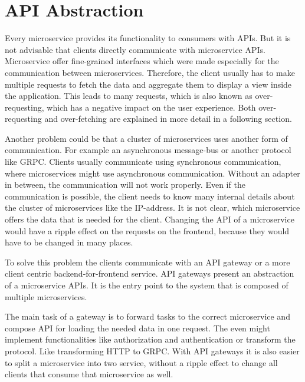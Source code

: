 \section{API Abstraction}

Every microservice provides its functionality to consumers with APIs. But it is not advisable that clients directly communicate with microservice APIs. Microservice offer fine-grained interfaces which were made especially for the communication between microservices. Therefore, the client usually has to make multiple requests to fetch the data and aggregate them to display a view inside the application. \cite[69]{book:2021:newman:background:bff:micro-services} This leads to many requests, which is also known as over-requesting, which has a negative impact on the user experience. \cite[254, 257]{book:2018:richardson:background:bff:microservices-patterns} Both over-requesting and over-fetching are explained in more detail in a following section.

\bigskip

\noindent Another problem could be that a cluster of microservices uses another form of communication. For example an asynchronous message-bus or another protocol like GRPC. Clients usually communicate using synchronous communication, where microservices might use asynchronous communication. Without an adapter in between, the communication will not work properly. Even if the communication is possible, the client needs to know many internal details about the cluster of microservices like the IP-address. It is not clear, which microservice offers the data that is needed for the client. Changing the API of a microservice would have a ripple effect on the requests on the frontend, because they would have to be changed in many places. \cite[254-257]{book:2018:richardson:background:bff:microservices-patterns}

\bigskip

\noindent To solve this problem the clients communicate with an API gateway or a more client centric backend-for-frontend service. API gateways present an abstraction of a microservice APIs. It is the entry point to the system that is composed of multiple microservices. \cite[19-20]{book:2020:siriwardena:background:bff:microservice-security-in-action}

\bigskip

\noindent The main task of a gateway is to forward tasks to the correct microservice and compose API for loading the needed data in one request. The even might implement functionalities like authorization and authentication or transform the protocol. Like transforming HTTP to GRPC. With API gateways it is also easier to split a microservice into two service, without a ripple effect to change all clients that consume that microservice as well. \cite[260-263]{book:2018:richardson:background:bff:microservices-patterns}

